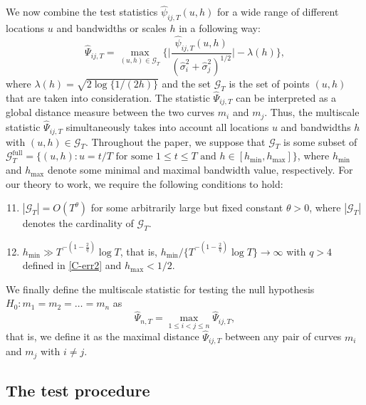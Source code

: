 \documentclass[a4paper,12pt]{article}
\begin{document}
We now combine the test statistics $\widehat{\psi}_{ij, T}(u,h)$ for a wide range of different locations $u$ and bandwidths or scales $h$ in a following way:
\[ \widehat{\Psi}_{ij,T} = \max_{(u,h) \in \mathcal{G}_T} \Big\{ \Big|\frac{\widehat{\psi}_{ij,T}(u,h)}{(\widehat{\sigma}_i^2 + \widehat{\sigma}_j^2)^{1/2}}\Big| - \lambda(h) \Big\}, \] 
where $\lambda(h) = \sqrt{2 \log \{ 1/(2h) \}}$ and the set $\mathcal{G}_T$ is the set of points $(u, h)$ that are taken into
consideration. The statistic $\widehat{\Psi}_{ij,T}$ can be interpreted as a global distance measure between the two curves $m_i$ and $m_j$. Thus, the multiscale statistic $\widehat{\Psi}_{ij, T}$ simultaneously takes into account all locations $u$ and bandwidths $h$ with $(u,h) \in \mathcal{G}_T$. Throughout the paper, we suppose that $\mathcal{G}_T$ is some subset of $\mathcal{G}_T^{\text{full}} = \{ (u,h): u = t/T \text{ for some } 1 \le t \le T \text{ and } h \in [h_{\min},h_{\max}] \}$, where $h_{\min}$ and $h_{\max}$ denote some minimal and maximal bandwidth value, respectively. For our theory to work, we require the following conditions to hold:
\begin{enumerate}[label=(C\arabic*),leftmargin=1.05cm]
\setcounter{enumi}{10}

\item \label{C-grid} $|\mathcal{G}_T| = O(T^\theta)$ for some arbitrarily large but fixed constant $\theta > 0$, where $|\mathcal{G}_T|$ denotes the cardinality of $\mathcal{G}_T$. 

\item \label{C-h} $h_{\min} \gg T^{-(1-\frac{2}{q})} \log T$, that is, $h_{\min} / \{ T^{-(1-\frac{2}{q})} \log T \} \rightarrow \infty$ with $q > 4$ defined in \ref{C-err2} and $h_{\max} < 1/2$.

\end{enumerate}

We finally define the multiscale statistic for testing the null hypothesis $H_0: m_1 =m_2 = \ldots = m_n$ as
\[ \widehat{\Psi}_{n,T} = \max_{1 \le i < j \le n} \widehat{\Psi}_{ij,T}, \]
that is, we define it as the maximal distance $\widehat{\Psi}_{ij,T}$ between any pair of curves $m_i$ and $m_j$ with $i \ne j$. 

\subsection{The test procedure}\label{subsec-test-test}
\end{document}
